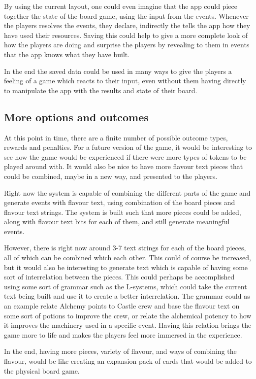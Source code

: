 By using the current layout, one could even imagine that the app could piece together the state of the board game, using the input from the events. Whenever the players resolves the events, they declare, indirectly the tells the app how they have used their resources. Saving this could help to give a more complete look of how the players are doing and surprise the players by revealing to them in events that the app knows what they have built.

In the end the saved data could be used in many ways to give the players a feeling of a game which reacts to their input, even without them having directly to manipulate the app with the results and state of their board.

\subsection{More options and outcomes}
At this point in time, there are a finite number of possible outcome types, rewards and penalties. For a future version of the game, it would be interesting to see how the game would be experienced if there were more types of tokens to be played around with. It would also be nice to have more flavour text pieces that could be combined, maybe in a new way, and presented to the players. 

Right now the system is capable of combining the different parts of the game and generate events with flavour text, using combination of the board pieces and flavour text strings.
The system is built such that more pieces could be added, along with flavour text bits for each of them, and still generate meaningful events. 

However, there is right now around 3-7 text strings for each of the board pieces, all of which can be combined which each other. This could of course be increased, but it would also be interesting to generate text which is capable of having some sort of interrelation between the pieces. 
This could perhaps be accomplished using some sort of grammar such as the L-systems, which could take the current text being built and use it to create a better interrelation. 
The grammar could as an example relate Alchemy points to Castle crew and base the flavour text on some sort of potions to improve the crew, or relate the alchemical potency to how it improves the machinery used in a specific event. 
Having this relation brings the game more to life and makes the players feel more immersed in the experience.

In the end, having more pieces, variety of flavour, and ways of combining the flavour, would be like creating an expansion pack of cards that would be added to the physical board game.

